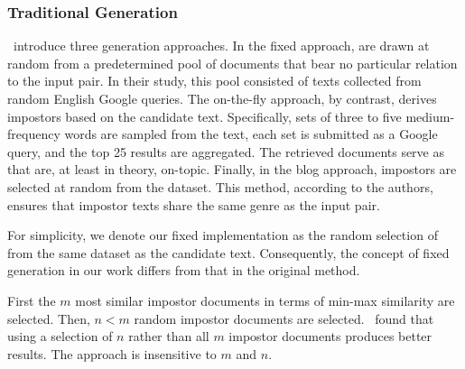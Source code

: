\subsubsection{Traditional \Imp{} Generation}
\label{subsubsec:traditional_impostor_generation}

\citet{koppel_determining_2014}\ introduce three \imp{} generation approaches. 
In the fixed approach, \imps{} are drawn at random from a predetermined pool of documents that bear no particular relation to the input pair.
In their study, this pool consisted of texts collected from random English Google queries. 
The on-the-fly approach, by contrast, derives impostors based on the candidate text. 
Specifically, sets of three to five medium-frequency words are sampled from the text, each set is submitted as a Google query, and the top 25 results are aggregated. 
The retrieved documents serve as \imps{} that are, at least in theory, on-topic. 
Finally, in the blog approach, impostors are selected at random from the \dataBlog{} dataset. 
This method, according to the authors, ensures that impostor texts share the same genre as the input pair.

For simplicity, we denote our fixed implementation as the random selection of \imps{} from the same dataset as the candidate text. 
Consequently, the concept of fixed \imp{} generation in our work differs from that in the original method.

First the $m$ most similar impostor documents in terms of min-max similarity are selected.
Then, $n < m$ random impostor documents are selected.
\citet{koppel_determining_2014}\ found that using a selection of $n$ \imps{} rather than all $m$ impostor documents produces better results.
The approach is insensitive to $m$ and $n$.